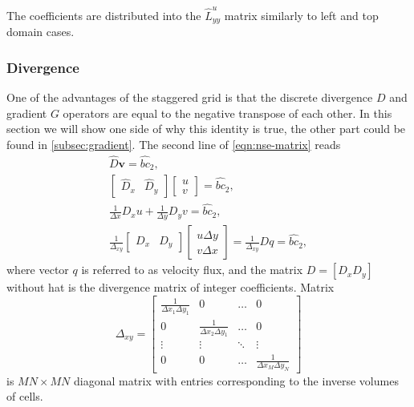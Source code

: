 \documentclass{article}
\begin{document}
The coefficients are distributed into the $\hat{L}^u_{yy}$ matrix similarly to left and top domain cases.


\subsubsection{Divergence}\label{subsec:divergence}

One of the advantages of the staggered grid is that the discrete divergence $D$ and gradient $G$ operators are equal to the negative transpose of each other. 
In this section we will show one side of why this identity is true, the other part could be found in \cref{subsec:gradient}.
The second line of \cref{eqn:nse-matrix} reads
\begin{equation*}
\begin{gathered}
\hat{D}\boldsymbol{v}=\hat{bc}_2,\\
\left[ 
\begin{array}{ll}
\hat{D}_x & \hat{D}_y 	
\end{array}
\right]\left[\begin{array}{l}
u\\
v
\end{array}
\right]=\hat{bc}_2
, \\
\frac{1}{\Delta x} D_x u+\frac{1}{\Delta y} D_y v=\hat{bc}_2, \\
\frac{1}{\Delta _{xy}}\left[\begin{array}{ll}
D_x & D_y
\end{array}\right]\left[\begin{array}{l}
u \Delta y \\
v \Delta x
\end{array}\right]=\frac{1}{\Delta _{xy}} D q=\hat{bc}_2,
\end{gathered}
\end{equation*}
where vector $q$ is referred to as velocity flux, and the matrix $D=[D_x D_y]$ without hat is the divergence matrix of integer coefficients. Matrix
\begin{equation}\label{eqn:delta-xy}
	\Delta _{xy}=
	\begin{bmatrix}{}
		\frac{1}{\Delta x_1\Delta y_1}		&0	&\dots	&0\\
		0		&\frac{1}{\Delta x_2\Delta y_1}	&\dots	&0\\
		\vdots		&\vdots	&\ddots	&\vdots\\
		0		&0	&\dots	&\frac{1}{\Delta x_M\Delta y_N}
	\end{bmatrix}
\end{equation}
is $MN\times MN$ diagonal matrix with entries corresponding to the inverse volumes of cells. 
\end{document}
